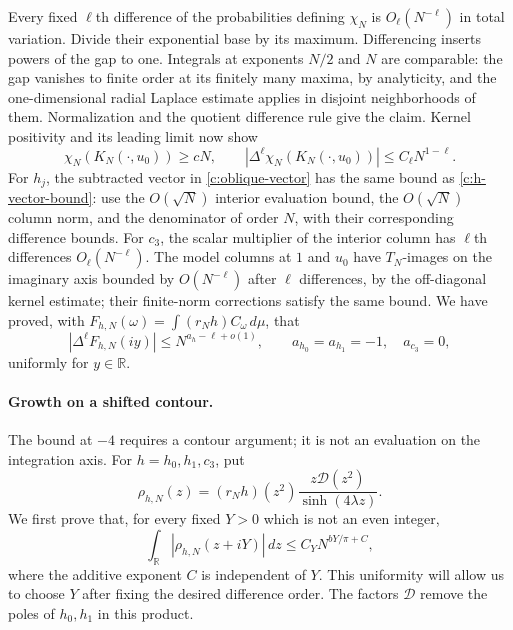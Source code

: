 \documentclass[11pt]{article}
\numberwithin{equation}{section}
\theoremstyle{definition}\newtheorem{definition}[theorem]{Definition}
\theoremstyle{remark}\newtheorem{remark}[theorem]{Remark}
\begin{document}
Every fixed $\ell$th difference of the probabilities defining
$\chi_N$ is $O_\ell(N^{-\ell})$ in total variation.  Divide their
exponential base by its maximum.  Differencing inserts powers of the
gap to one.  Integrals at exponents $N/2$ and $N$ are comparable:
the gap vanishes to finite order at its finitely many maxima, by
analyticity, and the one-dimensional radial Laplace estimate applies
in disjoint neighborhoods of them.  Normalization and the quotient
difference rule give the claim.  Kernel positivity and its leading
limit now show
\[
 \chi_N(K_N(\cdot,u_0))\ge cN,
 \qquad
 |\Delta^\ell\chi_N(K_N(\cdot,u_0))|
 \le C_\ell N^{1-\ell}.
\]
For $h_j$, the subtracted vector in \eqref{c:oblique-vector} has the
same bound as \eqref{c:h-vector-bound}: use the $O(\sqrt N)$ interior
evaluation bound, the $O(\sqrt N)$ column norm, and the denominator
of order $N$, with their corresponding difference bounds.  For $c_3$,
the scalar multiplier of the interior column has $\ell$th differences
$O_\ell(N^{-\ell})$.  The model columns at $1$ and $u_0$ have
$T_N$-images on the imaginary axis bounded by $O(N^{-\ell})$
after $\ell$ differences, by the off-diagonal kernel estimate; their
finite-norm corrections satisfy the same bound.  We have proved,
with $F_{h,N}(\omega)=\int(r_Nh)C_\omega\,d\mu$, that
\begin{equation}\label{c:transform-uniform}
 |\Delta^\ell F_{h,N}(iy)|\le N^{a_h-\ell+o(1)},\qquad
 a_{h_0}=a_{h_1}=-1,\quad a_{c_3}=0,
\end{equation}
uniformly for $y\in\mathbb R$.

\paragraph{Growth on a shifted contour.}
The bound at $-4$ requires a contour argument; it is not an evaluation
on the integration axis.  For $h=h_0,h_1,c_3$, put
\[
 \rho_{h,N}(z)
 =(r_Nh)(z^2)\frac{z\mathcal D(z^2)}{\sinh(4\lambda z)}.
\]
We first prove that, for every fixed $Y>0$ which is not an even integer,
\begin{equation}\label{c:contour-growth}
 \int_{\mathbb R}|\rho_{h,N}(z+iY)|\,dz
 \le C_Y N^{bY/\pi+C},
\end{equation}
where the additive exponent $C$ is independent of $Y$.  This uniformity
will allow us to choose $Y$ after fixing the desired difference order.
The factors $\mathcal D$ remove the poles of $h_0,h_1$ in this product.
\end{document}

